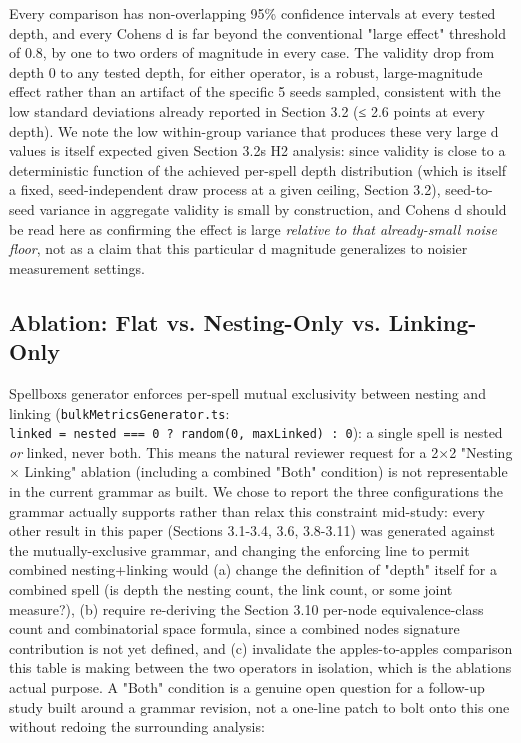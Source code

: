\documentclass[
  10pt,
  twocolumn]{article}
\begin{document}
Every comparison has non-overlapping 95\% confidence intervals at every
tested depth, and every Cohen\textquotesingle s d is far beyond the
conventional "large effect" threshold of 0.8, by one to two orders of
magnitude in every case. The validity drop from depth 0 to any tested
depth, for either operator, is a robust, large-magnitude effect rather
than an artifact of the specific 5 seeds sampled, consistent with the
low standard deviations already reported in Section 3.2 (≤ 2.6 points at
every depth). We note the low within-group variance that produces these
very large d values is itself expected given Section
3.2\textquotesingle s H2 analysis: since validity is close to a
deterministic function of the achieved per-spell depth distribution
(which is itself a fixed, seed-independent draw process at a given
ceiling, Section 3.2), seed-to-seed variance in aggregate validity is
small by construction, and Cohen\textquotesingle s d should be read here
as confirming the effect is large \emph{relative to that already-small
noise floor}, not as a claim that this particular d magnitude
generalizes to noisier measurement settings.

\subsection{Ablation: Flat vs. Nesting-Only vs.
Linking-Only}\label{ablation-flat-vs-nesting-only-vs-linking-only}

Spellbox\textquotesingle s generator enforces per-spell mutual
exclusivity between nesting and linking
(\texttt{bulkMetricsGenerator.ts}:
\texttt{linked\ =\ nested\ ===\ 0\ ?\ random(0,\ maxLinked)\ :\ 0}): a
single spell is nested \emph{or} linked, never both. This means the
natural reviewer request for a 2×2 "Nesting × Linking" ablation
(including a combined "Both" condition) is not representable in the
current grammar as built. We chose to report the three configurations
the grammar actually supports rather than relax this constraint
mid-study: every other result in this paper (Sections 3.1-3.4, 3.6,
3.8-3.11) was generated against the mutually-exclusive grammar, and
changing the enforcing line to permit combined nesting+linking would (a)
change the definition of "depth" itself for a combined spell (is depth
the nesting count, the link count, or some joint measure?), (b) require
re-deriving the Section 3.10 per-node equivalence-class count and
combinatorial space formula, since a combined node\textquotesingle s
signature contribution is not yet defined, and (c) invalidate the
apples-to-apples comparison this table is making between the two
operators in isolation, which is the ablation\textquotesingle s actual
purpose. A "Both" condition is a genuine open question for a follow-up
study built around a grammar revision, not a one-line patch to bolt onto
this one without redoing the surrounding analysis:
\end{document}
